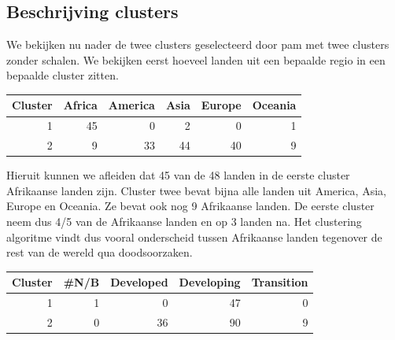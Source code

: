 \documentclass[a4paper,kulak]{kulakarticle}
\begin{document}
\subsection{Beschrijving clusters}
We bekijken nu nader de twee clusters geselecteerd door pam met twee clusters zonder schalen.
We bekijken eerst hoeveel landen uit een bepaalde regio in een bepaalde cluster zitten.
\begin{table}[ht]
\centering
\begin{tabular}{rrrrrr}
  \hline
 Cluster & Africa & America & Asia & Europe & Oceania \\ 
  \hline
1 &  45 &   0 &   2 &   0 &   1 \\ 
  2 &   9 &  33 &  44 &  40 &   9 \\ 
   \hline
\end{tabular}
\end{table}

Hieruit kunnen we afleiden dat 45 van de 48 landen in de eerste cluster Afrikaanse landen zijn.
Cluster twee bevat bijna alle landen uit America, Asia, Europe en Oceania.
Ze bevat ook nog 9 Afrikaanse landen.
De eerste cluster neem dus 4/5 van de Afrikaanse landen en op 3 landen na.
Het clustering algoritme vindt dus vooral onderscheid tussen Afrikaanse landen tegenover de rest van de wereld qua doodsoorzaken.

\begin{table}[ht]
\centering
\begin{tabular}{rrrrr}
  \hline
 Cluster & \#N/B & Developed & Developing & Transition \\
  \hline
1 &   1 &   0 &  47 &   0 \\
  2 &   0 &  36 &  90 &   9 \\
   \hline
\end{tabular}
\end{table}
\end{document}
